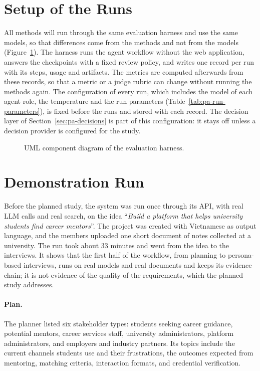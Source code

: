 \section{Setup of the Runs}
\label{sec:eval-details}

All methods will run through the same evaluation harness and use the same models, so that differences come from the methods and not from the models (Figure~\ref{fig:eval-harness}). The harness runs the agent workflow without the web application, answers the checkpoints with a fixed review policy, and writes one record per run with its steps, usage and artifacts. The metrics are computed afterwards from these records, so that a metric or a judge rubric can change without running the methods again. The configuration of every run, which includes the model of each agent role, the temperature and the run parameters (Table~\ref{tab:pa-run-parameters}), is fixed before the runs and stored with each record. The decision layer of Section~\ref{sec:pa-decisions} is part of this configuration: it stays off unless a decision provider is configured for the study.

\begin{figure}[H]
    \centering
    \resizebox{\linewidth}{!}{}
    \caption{UML component diagram of the evaluation harness.}
    \label{fig:eval-harness}
\end{figure}

\section{Demonstration Run}
\label{sec:eval-case-study}

Before the planned study, the system was run once through its API, with real LLM calls and real search, on the idea ``\textit{Build a platform that helps university students find career mentors}''. The project was created with Vietnamese as output language, and the members uploaded one short document of notes collected at a university. The run took about 33 minutes and went from the idea to the interviews. It shows that the first half of the workflow, from planning to persona-based interviews, runs on real models and real documents and keeps its evidence chain; it is not evidence of the quality of the requirements, which the planned study addresses.

\paragraph{Plan.} The planner listed six stakeholder types: students seeking career guidance, potential mentors, career services staff, university administrators, platform administrators, and employers and industry partners. Its topics include the current channels students use and their frustrations, the outcomes expected from mentoring, matching criteria, interaction formats, and credential verification.

